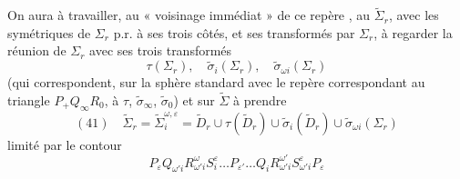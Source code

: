 \documentclass[11pt,a4paper]{article}
\begin{document}
On aura à travailler, au « voisinage immédiat » de ce repère \struck{\ill{}}, au
  $\widetilde{\Sigma}_r$, avec les symétriques de
$\Sigma_r$ p.r. à ses trois côtés, et ses transformés par $\Sigma_r$,
 à regarder la réunion de $\Sigma_r$ avec ses trois transformés
\[
  \tau(\Sigma_r), \quad \widetilde{\sigma}_i(\Sigma_r), \quad
  \widetilde{\sigma}_{\omega i}(\Sigma_r)
\]
(qui correspondent, sur la sphère standard avec le repère correspondant au triangle
$P_{+} Q_\infty R_0$, à $\tau$, $\widetilde{\sigma}_\infty$, $\widetilde{\sigma}_0$) et sur
$\widetilde{\Sigma}$ à prendre
\[
  (41)\quad
  \widetilde{\Sigma}_r = \widetilde{\Sigma}_i^{\omega,\varepsilon}
  = \widetilde{D}_r \cup \tau(\widetilde{D}_r) \cup \widetilde{\sigma}_i(\widetilde{D}_r)
  \cup \widetilde{\sigma}_{\omega i}(\Sigma_r)
\]
limité par le contour
\[
  P_\varepsilon Q_{\omega' i} R_{\omega' i}^{\omega} S_i^{\varepsilon} \ldots
  P_{\varepsilon'} \ldots Q_i R_{\omega' i}^{\omega'} S_{\omega' i}^{\varepsilon} P_\varepsilon
\]
\end{document}
